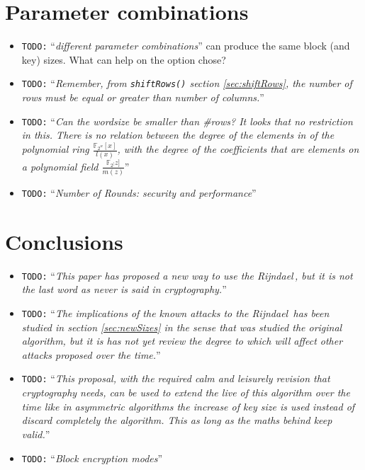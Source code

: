 \documentclass[10pt,a4paper,twoside]{llncs}
\newcommand{\todo}[1]{\texttt{\color{red}TODO:} ``\emph{#1}''}
\newcommand{\rijndael}{\emph{Rijndael}}
\newcommand{\Fpn}[2]{\ensuremath{\mathbb{F}_{#1^#2}}}
\begin{document}
\section{Parameter combinations}\label{sec:parameterCombinations}
\begin{itemize}
 \item \todo{different parameter combinations} can produce the same block (and key) sizes. What can help on the option chose?
 \item \todo{Remember, from {\tt shiftRows()} section \ref{sec:shiftRows}, the number of rows must be equal or greater than number of columns.}
 \item \todo{Can the wordsize be smaller than \#rows? It looks that no restriction in this. There is no relation between the degree of the elements in of the polynomial ring $\frac{\Fpn{2}{w}[x]}{l(x)}$, with the degree of the coefficients that are elements on a polynomial field $\frac{\Fpn{2}[z]}{m(z)}$}
 \item \todo{Number of Rounds: security and performance}
\end{itemize}

\section{Conclusions}\label{sec:conclusion}
\begin{itemize}
    \item \todo{This paper has proposed a new way to use the \rijndael\,, but it is not the last word as never is said in cryptography.}
    \item \todo{The implications of the known attacks to the \rijndael\, has been studied in section \ref{sec:newSizes} in the sense that was studied the original algorithm, but it is has not yet review the degree to which will affect other attacks proposed over the time.}
    \item \todo{This proposal, with the required calm and leisurely revision that cryptography needs, can be used to extend the live of this algorithm over the time like in asymmetric algorithms the increase of key size is used instead of discard completely the algorithm. This as long as the maths behind keep valid.}
    \item \todo{Block encryption modes}
\end{itemize}
\end{document}
